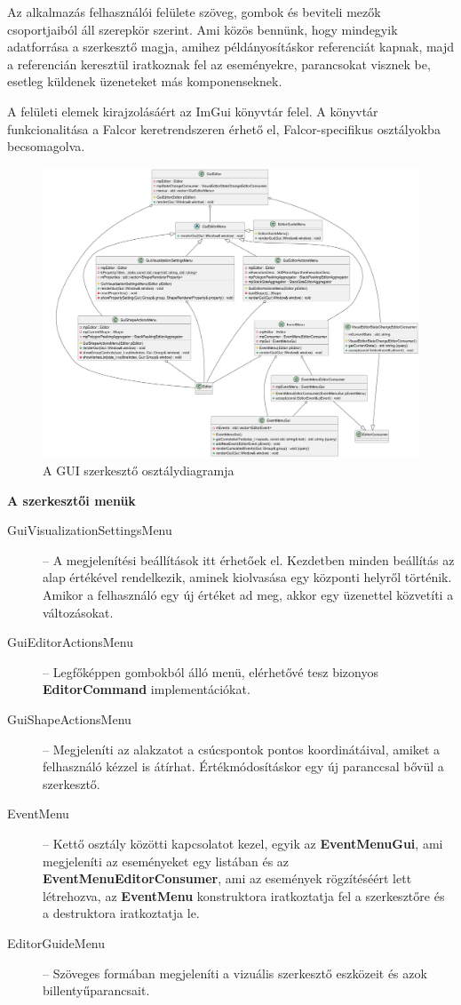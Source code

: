 Az alkalmazás felhasználói felülete szöveg, gombok és beviteli mezők csoportjaiból áll szerepkör szerint. Ami közös bennünk, hogy mindegyik adatforrása a szerkesztő magja, amihez példányosításkor referenciát kapnak, majd a referencián keresztül iratkoznak fel az eseményekre, parancsokat visznek be, esetleg küldenek üzeneteket más komponenseknek.

A felületi elemek kirajzolásáért az ImGui könyvtár felel. A könyvtár funkcionalitása a Falcor keretrendszeren érhető el, Falcor-specifikus osztályokba becsomagolva.


\begin{figure}[H]
    \centering
    \includegraphics[width=1\linewidth]{images/class_gui_editor.png}
    \caption{A GUI szerkesztő osztálydiagramja}
    \label{fig:class_gui_editor-1}
\end{figure}

\textbf{A szerkesztői menük}

\begin{description}
    \item[GuiVisualizationSettingsMenu] -- A megjelenítési beállítások itt érhetőek el. Kezdetben minden beállítás az alap értékével rendelkezik, aminek kiolvasása egy központi helyről történik. Amikor a felhasználó egy új értéket ad meg, akkor egy üzenettel közvetíti a változásokat.
    \item[GuiEditorActionsMenu] -- Legfőképpen gombokból álló menü, elérhetővé tesz bizonyos \textbf{EditorCommand} implementációkat.
    \item[GuiShapeActionsMenu] -- Megjeleníti az alakzatot a csúcspontok pontos koordinátáival, amiket a felhasználó kézzel is átírhat. Értékmódosításkor egy új paranccsal bővül a szerkesztő.
    \item[EventMenu] -- Kettő osztály közötti kapcsolatot kezel, egyik az \textbf{EventMenuGui}, ami megjeleníti az eseményeket egy listában és az \textbf{EventMenuEditorConsumer}, ami az események rögzítéséért lett létrehozva, az \textbf{EventMenu} konstruktora iratkoztatja fel a szerkesztőre és a destruktora iratkoztatja le.
    \item[EditorGuideMenu] -- Szöveges formában megjeleníti a vizuális szerkesztő eszközeit és azok billentyűparancsait.
\end{description}


